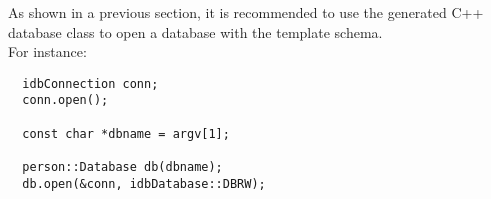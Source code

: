As shown in a previous section, it is recommended to use the generated
C++ database class to open a database with the template schema.
\\
For instance:
\verbsize
\begin{verbatim}
  idbConnection conn;
  conn.open();

  const char *dbname = argv[1];

  person::Database db(dbname);
  db.open(&conn, idbDatabase::DBRW);
\end{verbatim}
\normalsize









